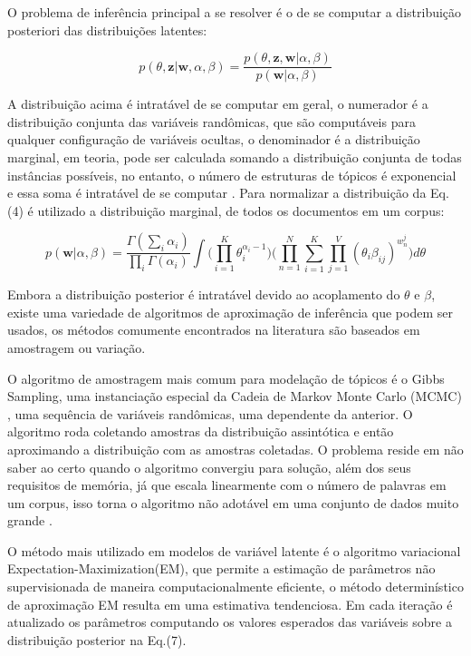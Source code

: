 \documentclass[12pt,a4paper]{article}
\begin{document}
O problema de inferência principal a se resolver é o de se computar a distribuição posteriori das distribuições latentes:

\begin{equation}
p(\theta,\textbf{z}|\textbf{w},\alpha,\beta) = \frac{p(\theta,\textbf{z},\textbf{w}|\alpha,\beta)}{p(\textbf{w}|\alpha,\beta)}
\end{equation}

A distribuição acima é intratável de se computar em geral, o numerador é a distribuição conjunta das variáveis randômicas, que são computáveis para qualquer configuração de variáveis ocultas, o denominador é a distribuição marginal, em teoria, pode ser calculada somando a distribuição conjunta de todas instâncias possíveis, no entanto, o número de estruturas de tópicos é exponencial e essa soma é intratável de se computar \cite{blei2012probabilistic}. Para normalizar a distribuição da Eq.(4) é utilizado a distribuição marginal, de todos os documentos em um corpus:

\begin{equation}
p(\textbf{w}|\alpha,\beta)=\frac{\Gamma(\sum_{i}\alpha_i)}{\prod_{i}\Gamma(\alpha_i)}\int{\Bigg(\prod_{i=1}^{K}\theta_i^{\alpha_i-1}\Bigg)} \Bigg(\prod_{n=1}^{N}\sum_{i=1}^{K}\prod_{j=1}^{V}(\theta_i\beta_{ij})^{w_n^j}\Bigg)d\theta
\end{equation}

Embora a distribuição posterior é intratável devido ao acoplamento do $\theta$ e $\beta$, existe uma variedade de algoritmos de aproximação de inferência que podem ser usados, os métodos comumente encontrados na literatura são baseados em amostragem ou variação.

O algoritmo de amostragem mais comum para modelação de tópicos é o Gibbs Sampling, uma instanciação especial da Cadeia de Markov Monte Carlo (MCMC) \cite{jordan1999introduction}, uma sequência de variáveis randômicas, uma dependente da anterior. O algoritmo roda coletando amostras da distribuição assintótica e então aproximando a distribuição com as amostras coletadas. O problema reside em não saber ao certo  quando o algoritmo convergiu para solução, além dos seus requisitos de memória, já que escala linearmente com o número de palavras em um corpus, isso torna o algoritmo não adotável em uma conjunto de dados muito grande \cite{vrehuuvrek2011scalability}.

O método mais utilizado em modelos de variável latente é o algoritmo variacional Expectation-Maximization(EM), que permite a estimação de parâmetros não supervisionada de maneira computacionalmente eficiente, o método determinístico de aproximação EM resulta em uma estimativa tendenciosa. Em cada iteração é atualizado os parâmetros computando os valores esperados das variáveis sobre a distribuição posterior na Eq.(7).
\end{document}

